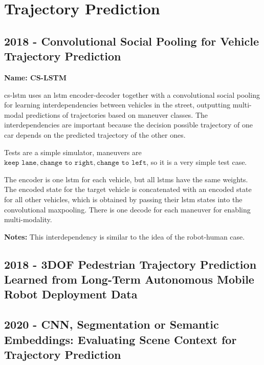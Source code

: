 \section{Trajectory Prediction}\label{sec: traj prediction}

\subsection*{2018 - Convolutional Social Pooling for Vehicle Trajectory Prediction}

\textbf{Name: CS-LSTM}

\cite{deo2018convolutional} \gls{cs-lstm} uses an \gls{lstm} encoder-decoder together with a convolutional social pooling for learning interdependencies between vehicles in the street, outputting multi-modal predictions of trajectories based on maneuver classes.
%
The interdependencies are important because the decision possible trajectory of one car depends on the predicted trajectory of the other ones.

Tests are a simple simulator, maneuvers are ${\texttt{keep lane}, \texttt{change to right}, \texttt{change to left}}$, so it is a very simple test case.

The encoder is one \gls{lstm} for each vehicle, but all \glspl{lstm} have the same weights.
%
The encoded state for the target vehicle is concatenated with an encoded state for all other vehicles, which is obtained by passing their \gls{lstm} states into the convolutional maxpooling.
%
There is one decode for each maneuver for enabling multi-modality.

\textbf{Notes:} This interdependency is similar to the idea of the robot-human case.

\subsection*{2018 - 3DOF Pedestrian Trajectory Prediction Learned from Long-Term Autonomous Mobile Robot Deployment Data}

\cite{sun20183dof}

\subsection*{2020 - CNN, Segmentation or Semantic Embeddings: Evaluating Scene Context for Trajectory Prediction}

\cite{syed2020cnn}